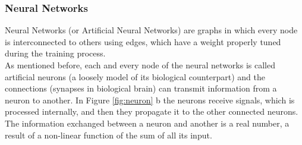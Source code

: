 \subsubsection{Neural Networks}

Neural Networks (or Artificial Neural Networks) are graphs in which every node is interconnected to others using edges, which have a weight properly tuned during the training process.\\
As mentioned before, each and every node of the neural networks is called artificial neurons (a loosely model of its biological counterpart) and the connections (synapses in biological brain) can transmit information from a neuron to another. In Figure \ref{fig:neuron} b the neurons receive signals, which is processed internally, and then they propagate it to the other connected neurons.\\
The information exchanged between a neuron and another is a real number, a result of a non-linear function of the sum of all its input.

